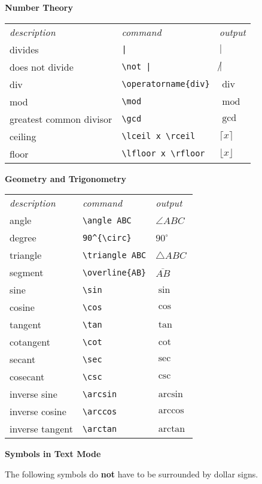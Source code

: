 \documentclass[10pt,landscape]{article}
\newcommand{\ColorSection}[1]{\par\vspace{1.5ex}\noindent\textcolor{sectioncolor}{\Large\bfseries #1}\par\vspace{0.75ex}}
\newcommand{\ColorSubsection}[1]{\par\vspace{1ex}\noindent\textcolor{subsectioncolor}{\normalsize\bfseries #1}\par\vspace{0.5ex}}
\begin{document}
\begin{multicols}{3}
\columnbreak
\ColorSubsection{Number Theory}
\begin{tabular}{lll}
\emph{description} & \emph{command} & \emph{output}\\
divides & \verb!|! & \(|\)\\
does not divide & \verb!\not |! & \(\not |\)\\
div & \verb!\operatorname{div}! & \(\operatorname{div}\)\\
mod & \verb!\mod! & \(\operatorname{mod}\)\\
greatest common divisor & \verb!\gcd! & \(\gcd\)\\
ceiling & \verb!\lceil x \rceil! & \(\lceil x\rceil\)\\
floor & \verb!\lfloor x \rfloor! & \(\lfloor x \rfloor\)\\
\end{tabular}




\ColorSubsection{Geometry and Trigonometry}
\begin{tabular}{lll}
\emph{description} & \emph{command} & \emph{output}\\
angle& \verb!\angle ABC! & \(\angle ABC\)\\
degree& \verb!90^{\circ}! & \(90^{\circ}\)\\
triangle& \verb!\triangle ABC! & \(\triangle ABC\)\\
segment& \verb!\overline{AB}! & \(\overline{AB}\)\\
sine& \verb!\sin! & \(\sin\)\\
cosine& \verb!\cos! & \(\cos\)\\
tangent& \verb!\tan! & \(\tan\)\\
cotangent& \verb!\cot! & \(\cot\)\\
secant& \verb!\sec! & \(\sec\)\\
cosecant& \verb!\csc! & \(\csc\)\\
inverse sine& \verb!\arcsin! & \(\arcsin\)\\
inverse cosine& \verb!\arccos! & \(\arccos\)\\
inverse tangent& \verb!\arctan! & \(\arctan\)\\
\end{tabular}

\ColorSection{Symbols in Text Mode}

The following symbols do \textbf{not} have to be surrounded by dollar signs.


\end{multicols}
\end{document}
